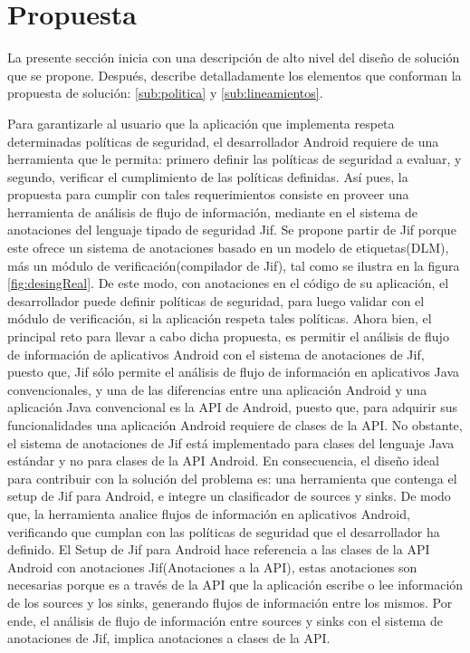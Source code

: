 \section{Propuesta}
\label{sec:propuesta}
La presente sección inicia con una descripción de alto nivel del diseño de
solución que se propone. Después, describe detalladamente los elementos que
conforman la propuesta de solución: \ref{sub:politica} y
\ref{sub:lineamientos}.\newline

Para garantizarle al usuario que la aplicación que implementa respeta
determinadas políticas de seguridad, el desarrollador Android requiere de una
herramienta que le permita: primero definir las políticas de seguridad a
evaluar, y segundo, verificar el cumplimiento de las políticas
definidas.\newline 
Así pues, la propuesta para cumplir con tales requerimientos consiste en proveer
una herramienta de análisis de flujo de información, mediante en el sistema de
anotaciones del lenguaje tipado de seguridad Jif. Se propone partir de Jif
porque este ofrece un sistema de anotaciones basado en un modelo de
etiquetas(DLM), más un módulo de verificación(compilador de Jif),
tal como se ilustra en la figura \ref{fig:desingReal}.
De este modo, con anotaciones en el código de su aplicación, el desarrollador
puede definir políticas de seguridad, para luego validar con el módulo de
verificación, si la aplicación respeta tales políticas.\newline 
Ahora bien, el principal reto para llevar a cabo dicha propuesta, es permitir el
análisis de flujo de información de aplicativos Android con el sistema de
anotaciones de Jif, puesto que, Jif sólo permite el análisis de flujo de
información en aplicativos Java convencionales, y una de las diferencias entre
una aplicación Android y una aplicación Java convencional es la API de Android,
puesto que, para adquirir sus funcionalidades una aplicación Android requiere de
clases de la API. No obstante, el sistema de anotaciones de Jif está
implementado para clases del lenguaje Java estándar y no para clases de la API
Android.\newline 
En consecuencia, el diseño ideal para contribuir con la solución del problema es:
una herramienta que contenga el setup de Jif para Android, e integre un clasificador de sources
y sinks. De modo que, la herramienta analice flujos de información en
aplicativos Android, verificando que cumplan con las políticas de seguridad que
el desarrollador ha definido.\newline 
El Setup de Jif para Android hace referencia a las clases de la API Android con
anotaciones Jif(Anotaciones a la API), estas anotaciones son necesarias porque
es a través de la API que la aplicación escribe o lee información de los sources
y los sinks, generando flujos de información entre los mismos. Por ende, el
análisis de flujo de información entre sources y sinks con el sistema de
anotaciones de Jif, implica anotaciones a clases de la API. 

